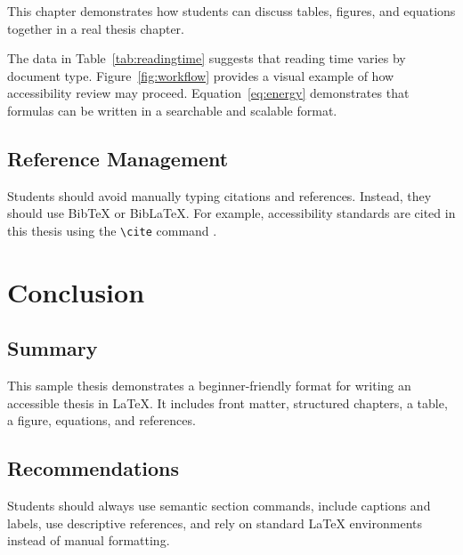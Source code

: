 \documentclass[12pt]{report}
\begin{document}
This chapter demonstrates how students can discuss tables, figures, and equations together in a real thesis chapter. 
 
The data in Table~\ref{tab:readingtime} suggests that reading time varies by document type. Figure~\ref{fig:workflow} provides a visual example of how accessibility review may proceed. Equation~\ref{eq:energy} demonstrates that formulas can be written in a searchable and scalable format. 
 
\section{Reference Management} 
 
Students should avoid manually typing citations and references. Instead, they should use BibTeX or BibLaTeX. For example, accessibility standards are cited in this thesis using the \verb|\cite| command \cite{section508}. 
 
\chapter{Conclusion} 
\section{Summary} 
 
This sample thesis demonstrates a beginner-friendly format for writing an accessible thesis in LaTeX. It includes front matter, structured chapters, a table, a figure, equations, and references. 
 
\section{Recommendations} 
 
Students should always use semantic section commands, include captions and labels, use descriptive references, and rely on standard LaTeX environments instead of manual formatting. 
 
 
 
 
\end{document}
